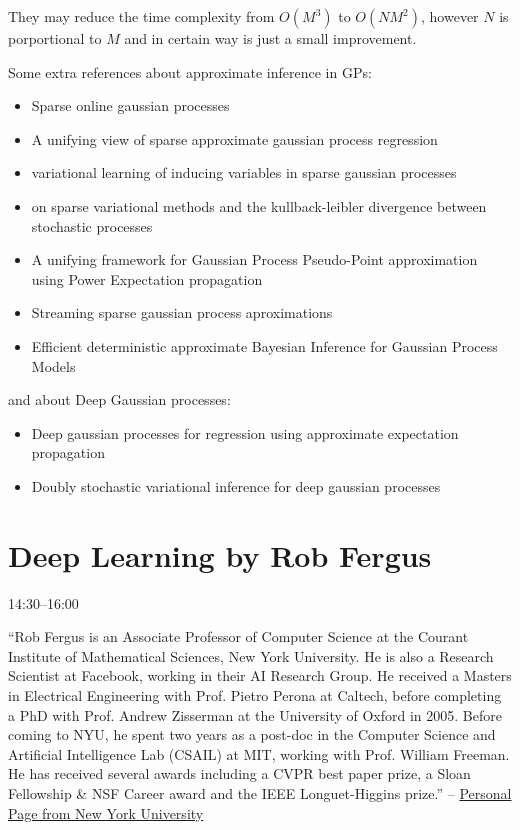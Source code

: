 \documentclass[b5paper]{report}
\begin{document}
They may reduce the time complexity from $O(M^3)$ to $O(NM^2)$, however $N$ is
porportional to $M$ and in certain way is just a small improvement.

Some extra references about approximate inference in GPs:

\begin{itemize}
  \item Sparse online gaussian processes
  \item A unifying view of sparse approximate gaussian process regression
  \item variational learning of inducing variables in sparse gaussian processes
  \item on sparse variational methods and the kullback-leibler divergence
    between stochastic processes
  \item A unifying framework for Gaussian Process Pseudo-Point approximation
    using Power Expectation propagation
  \item Streaming sparse gaussian process aproximations
  \item Efficient deterministic approximate Bayesian Inference for Gaussian
    Process Models
\end{itemize}


and about Deep Gaussian processes:

\begin{itemize}
  \item Deep gaussian processes for regression using approximate expectation
    propagation
  \item Doubly stochastic variational inference for deep gaussian processes
\end{itemize}


\chapter{Deep Learning by Rob Fergus}

 14:30--16:00

``Rob Fergus is an Associate Professor of Computer Science at the Courant
Institute of Mathematical Sciences, New York University. He is also a Research
Scientist at Facebook, working in their AI Research Group. He received a
Masters in Electrical Engineering with Prof. Pietro Perona at Caltech, before
completing a PhD with Prof. Andrew Zisserman at the University of Oxford in
2005. Before coming to NYU, he spent two years as a post-doc in the Computer
Science and Artificial Intelligence Lab (CSAIL) at MIT, working with Prof.
William Freeman. He has received several awards including a CVPR best paper
prize, a Sloan Fellowship \& NSF Career award and the IEEE Longuet-Higgins
prize.'' -- \href{https://cs.nyu.edu/~fergus/pmwiki/pmwiki.php?n=PmWiki.Bio}{Personal
Page from New York University}
\end{document}

